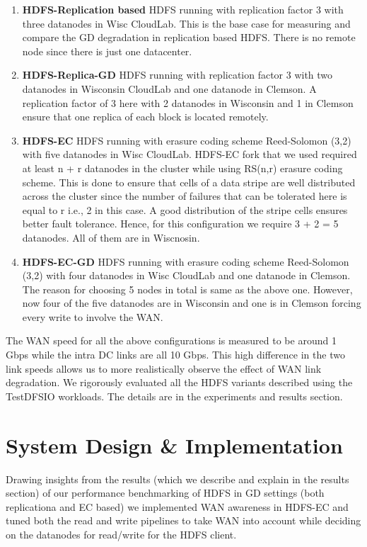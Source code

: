 \documentclass{sig-alternate-05-2015}
\begin{document}
\begin{enumerate}
  \item \textbf{HDFS-Replication based} HDFS running with replication factor 3 with three datanodes in Wisc CloudLab. This is the base case for measuring  and compare the GD degradation in replication based HDFS. There is no remote node since there is just one datacenter.  
	\item \textbf{HDFS-Replica-GD} HDFS running with replication factor 3 with two datanodes in Wisconsin CloudLab and one datanode in Clemson. A replication factor of 3 here with 2 datanodes in Wisconsin and 1 in Clemson ensure that one replica of each block is located remotely.
	\item \textbf{HDFS-EC} HDFS running with erasure coding scheme Reed-Solomon (3,2) with five datanodes in Wisc CloudLab. HDFS-EC fork that we used\cite{hdfsec} required at least n + r datanodes in the cluster while using  RS(n,r) erasure coding scheme. This is done to ensure that cells of a data stripe are well distributed across the cluster since the number of failures that can be tolerated here is equal to r i.e., 2 in this case. A good distribution of the stripe cells ensures better fault tolerance.  Hence, for this configuration we require 3 + 2 = 5 datanodes. All of them are in Wiscnosin.
	\item \textbf{HDFS-EC-GD} HDFS running with erasure coding scheme Reed-Solomon (3,2) with four datanodes in Wisc CloudLab and one datanode in Clemson. The reason for choosing 5 nodes in total is same as the above one. However, now four of the five datanodes are in Wisconsin and one is in Clemson forcing every write to involve the WAN. 
  \end{enumerate}
The WAN speed for all the above configurations is measured to be around 1 Gbps while the intra DC links are all 10 Gbps. This high difference in the two link speeds allows us to more realistically observe the effect of WAN link degradation. We rigorously evaluated all the HDFS variants described using the TestDFSIO workloads. The details are in the experiments and results section. 

\section{System Design \& Implementation}
Drawing insights from the results (which we describe and explain in the results section) of our performance benchmarking of HDFS in GD settings (both replicationa and EC based)  we implemented WAN awareness in HDFS-EC and tuned both the read and write pipelines to take WAN into account while deciding on the datanodes for read/write for the HDFS client. 
\end{document}
